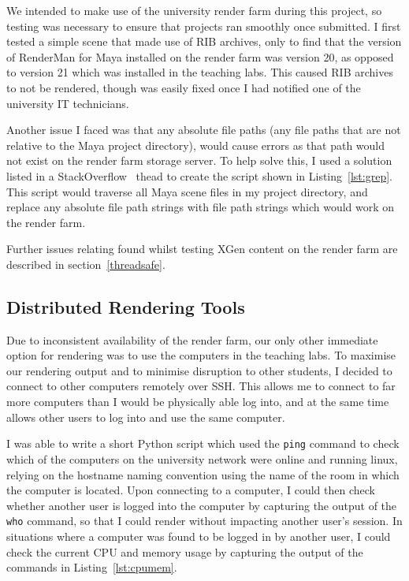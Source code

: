 \documentclass[11pt]{article}
\begin{document}
We intended to make use of the university render farm during this project, so testing was necessary to ensure that projects ran smoothly once submitted. I first tested a simple scene that made use of RIB archives, only to find that the version of RenderMan for Maya installed on the render farm was version 20, as opposed to version 21 which was installed in the teaching labs. This caused RIB archives to not be rendered, though was easily fixed once I had notified one of the university IT technicians.

Another issue I faced was that any absolute file paths (any file paths that are not relative to the Maya project directory), would cause errors as that path would not exist on the render farm storage server. To help solve this, I used a solution listed in a StackOverflow~\cite{stackoverflow} thead to create the script shown in Listing~\ref{lst:grep}. This script would traverse all Maya scene files in my project directory, and replace any absolute file path strings with file path strings which would work on the render farm.

Further issues relating found whilst testing XGen content on the render farm are described in section~\ref{threadsafe}.

\subsection{Distributed Rendering Tools}

Due to inconsistent availability of the render farm, our only other immediate option for rendering was to use the computers in the teaching labs. To maximise our rendering output and to minimise disruption to other students, I decided to connect to other computers remotely over SSH. This allows me to connect to far more computers than I would be physically able log into, and at the same time allows other users to log into and use the same computer.

I was able to write a short Python script which used the \texttt{ping} command to check which of the computers on the university network were online and running linux, relying on the hostname naming convention using the name of the room in which the computer is located. Upon connecting to a computer, I could then check whether another user is logged into the computer by capturing the output of the \texttt{who} command, so that I could render without impacting another user's session. In situations where a computer was found to be logged in by another user, I could check the current CPU and memory usage by capturing the output of the commands in Listing~\ref{lst:cpumem}.
\end{document}
